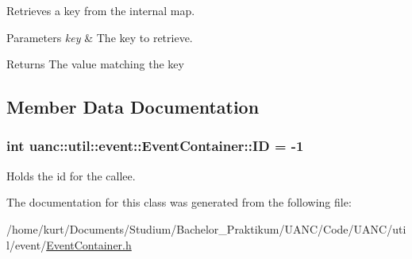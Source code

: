Retrieves a key from the internal map. 


\begin{DoxyParams}{Parameters}
{\em key} & The key to retrieve. \\
\hline
\end{DoxyParams}
\begin{DoxyReturn}{Returns}
The value matching the key 
\end{DoxyReturn}


\subsection{Member Data Documentation}
\subsubsection[{\texorpdfstring{ID}{ID}}]{\setlength{\rightskip}{0pt plus 5cm}int uanc\+::util\+::event\+::\+Event\+Container\+::\+ID = -\/1}\hypertarget{classuanc_1_1util_1_1event_1_1_event_container_a27f819d0a217a8887c884cf2c69da4b7}{}\label{classuanc_1_1util_1_1event_1_1_event_container_a27f819d0a217a8887c884cf2c69da4b7}
Holds the id for the callee. 

The documentation for this class was generated from the following file\+:\begin{DoxyCompactItemize}
\item 
/home/kurt/\+Documents/\+Studium/\+Bachelor\+\_\+\+Praktikum/\+U\+A\+N\+C/\+Code/\+U\+A\+N\+C/util/event/\hyperlink{_event_container_8h}{Event\+Container.\+h}\end{DoxyCompactItemize}

